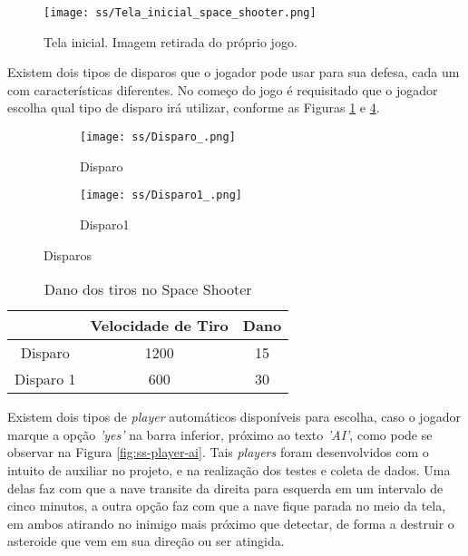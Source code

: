 \begin{figure}
  \centering
  \texttt{[image: ss/Tela\_inicial\_space\_shooter.png]}
  \caption{Tela inicial. Imagem retirada do próprio jogo.\label{fig:ss-start}}
\end{figure}

Existem dois tipos de disparos que o jogador pode usar para sua defesa, cada um com características diferentes. No começo do jogo é requisitado que o jogador escolha qual tipo de disparo irá utilizar, conforme as Figuras \ref{fig:ss-start} e \ref{fig:ss-disparos}.

\begin{figure}
     \centering
     \begin{subfigure}[b]{0.15\textwidth}
         \centering
         \texttt{[image: ss/Disparo\_.png]}
         \caption{Disparo}
         \label{fig:ss-disparo}
     \end{subfigure}
     \begin{subfigure}[b]{0.15\textwidth}
         \centering
         \texttt{[image: ss/Disparo1\_.png]}
         \caption{Disparo1}
         \label{fig:ss-disparo1}
     \end{subfigure}
     \caption{Disparos}
     \label{fig:ss-disparos}
\end{figure}

\begin{table}
\caption{Dano dos tiros no Space Shooter}
\begin{tabular}{c|cc}
          & Velocidade de Tiro & Dano \\ \hline
Disparo   & 1200  & 15     \\
Disparo 1 & 600   & 30    
\end{tabular}
\label{tab:tiro=-ss}
\end{table}

Existem dois tipos de \textit{player} automáticos disponíveis para escolha, caso o jogador marque a opção \textit{'yes'} na barra inferior, próximo ao texto \textit{'AI'}, como pode se observar na Figura \ref{fig:ss-player-ai}. Tais \textit{players} foram desenvolvidos com o intuito de auxiliar no projeto, e na realização dos testes e coleta de dados. Uma delas faz com que a nave transite da direita para esquerda em um intervalo de cinco minutos, a outra opção faz com que a nave fique parada no meio da tela, em ambos atirando no inimigo mais próximo que detectar, de forma a destruir o asteroide que vem em sua direção ou ser atingida.  

